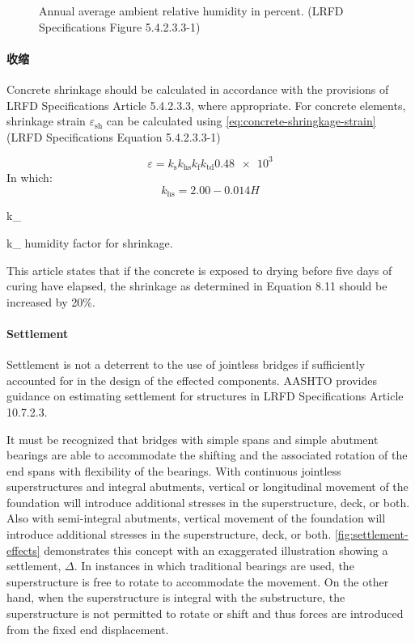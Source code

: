 
\begin{figure}
  \caption{Annual average ambient relative humidity in percent. (LRFD Specifications Figure 5.4.2.3.3-1)}
  \label{fig:annual-average-humidity}
\end{figure}

\paragraph{收缩}
Concrete shrinkage should be calculated in accordance with the provisions of LRFD Specifications Article 5.4.2.3.3, where appropriate. For concrete elements, shrinkage strain $\varepsilon_\text{sh}$ can be calculated using \cref{eq:concrete-shringkage-strain} (LRFD Specifications Equation 5.4.2.3.3-1)

\begin{equation}
  \label{eq:concrete-shringkage-strain}
  \varepsilon = k_\text{s} k_\text{hs} k_\text{f} k_\text{td}\num{0.48e3}
\end{equation}
In which:
\begin{equation}
  k_\text{hs}= 2.00-0.014H
\end{equation}
\begin{EqDesc}{k_}
  \item[k_\text{hs}] humidity factor for shrinkage.
\end{EqDesc}

This article states that if the concrete is exposed to drying before five days of curing have elapsed, the shrinkage
as determined in Equation 8.11 should be increased by 20\%.


\paragraph{Settlement}
Settlement is not a deterrent to the use of jointless bridges if sufficiently accounted for in the design of the effected components. AASHTO provides guidance on estimating settlement for structures in LRFD Specifications Article 10.7.2.3.

It must be recognized that bridges with simple spans and simple abutment bearings are able to accommodate the shifting and the associated rotation of the end spans with flexibility of the bearings. With continuous jointless superstructures and integral abutments, vertical or longitudinal movement of the foundation will introduce additional stresses in the superstructure, deck, or both. Also with semi-integral abutments, vertical movement of the foundation will introduce additional stresses in the superstructure, deck, or both. \cref{fig:settlement-effects} demonstrates this concept with an exaggerated illustration showing a settlement, $\Delta$. In instances in which traditional bearings are used, the superstructure is free to rotate to accommodate the movement. On the other hand, when the superstructure is integral with the substructure, the superstructure is not permitted to rotate or shift and thus forces are introduced from the fixed end displacement.

